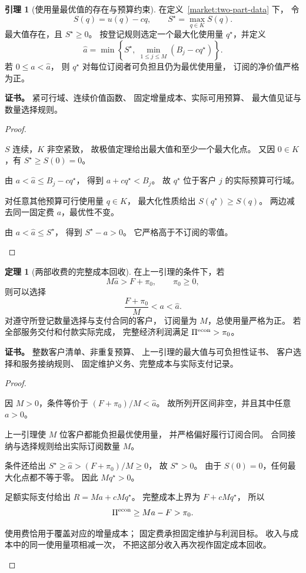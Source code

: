\documentclass[UTF8,12pt,a4paper,openany,fontset=none,zihao=false]{ctexrep}
\theoremstyle{definition}
\newtheorem{theorem}{定理}[chapter]
\newtheorem{lemma}{引理}[chapter]
\newenvironment{certificate}{\par\noindent\textbf{证书。}\ignorespaces}{\par}
\newcommand{\1}{\mathbf 1}
\begin{document}
\begin{lemma}[使用量最优值的存在与预算约束]
\label{market:usage-maximum}
在定义~\ref{market:two-part-data} 下，
令
\[
 S(q)=u(q)-cq,\qquad S^\star=\max_{q\in K}S(q).
\]
最大值存在，且 \(S^\star\ge0\)。
按登记规则选定一个最大化使用量 \(q^\star\)，并定义
\[
 \widehat a
 =\min\left\{S^\star,\ \min_{1\le j\le M}(B_j-cq^\star)\right\}.
\]
若 \(0\le a<\widehat a\)，
则 \(q^\star\) 对每位订阅者可负担且仍为最优使用量，
订阅的净价值严格为正。
\end{lemma}
\begin{certificate}
紧可行域、连续价值函数、
固定增量成本、实际可用预算、
最大值见证与数量选择规则。
\end{certificate}
\begin{proof}
\begin{semanticsteps}
\item \(S\) 连续，\(K\) 非空紧致，
故极值定理给出最大值和至少一个最大化点。
又因 \(0\in K\)，有
\(S^\star\ge S(0)=0\)。
\item 由 \(a<\widehat a\le B_j-cq^\star\)，
得到 \(a+cq^\star<B_j\)。
故 \(q^\star\) 位于客户 \(j\) 的实际预算可行域。
\item 对任意其他预算可行使用量 \(q\in K\)，
最大化性质给出 \(S(q^\star)\ge S(q)\)。
两边减去同一固定费 \(a\)，最优性不变。
\item 由 \(a<\widehat a\le S^\star\)，
得到 \(S^\star-a>0\)。
它严格高于不订阅的零值。
\end{semanticsteps}
\end{proof}

\begin{theorem}[两部收费的完整成本回收]
\label{market:two-part}
在上一引理的条件下，若
\[
 M\widehat a>F+\pi_0,
 \qquad \pi_0\ge0,
\]
则可以选择
\[
 \frac{F+\pi_0}{M}<a<\widehat a.
\]
对遵守所登记数量选择与支付合同的客户，
订阅量为 \(M\)，总使用量严格为正。
若全部服务交付和付款实际完成，
完整经济利润满足 \(\Pi^{\rm econ}>\pi_0\)。
\end{theorem}
\begin{certificate}
整数客户清单、非重复预算、
上一引理的最大值与可负担性证书、
客户选择和服务接纳规则、
固定维护义务、完整成本与实际支付记录。
\end{certificate}
\begin{proof}
\begin{semanticsteps}
\item 因 \(M>0\)，条件等价于
\((F+\pi_0)/M<\widehat a\)。
故所列开区间非空，并且其中任意 \(a>0\)。
\item 上一引理使 \(M\) 位客户都能负担最优使用量，
并严格偏好履行订阅合同。
合同接纳与选择规则给出实际订阅数量 \(M\)。
\item 条件还给出
\(S^\star\ge\widehat a>(F+\pi_0)/M\ge0\)，
故 \(S^\star>0\)。
由于 \(S(0)=0\)，任何最大化点都不等于零。
因此 \(Mq^\star>0\)。
\item 足额实际支付给出
\(R=Ma+cMq^\star\)。
完整成本上界为 \(F+cMq^\star\)，
所以
\[
 \Pi^{\rm econ}\ge Ma-F>\pi_0.
\]
\item 使用费恰用于覆盖对应的增量成本；
固定费承担固定维护与利润目标。
收入与成本中的同一使用量项相减一次，
不把这部分收入再次视作固定成本回收。
\end{semanticsteps}
\end{proof}
\end{document}
